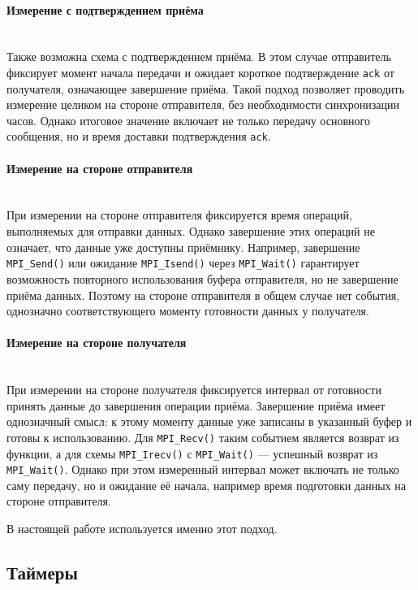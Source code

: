 \documentclass[a4paper,14pt]{extarticle}
\begin{document}
\paragraph{Измерение с подтверждением приёма}\mbox{}\\
\indent Также возможна схема с подтверждением приёма. В этом случае отправитель фиксирует момент начала передачи и ожидает короткое подтверждение \texttt{ack} от получателя, означающее завершение приёма. Такой подход позволяет проводить измерение целиком на стороне отправителя, без необходимости синхронизации часов. Однако итоговое значение включает не только передачу основного сообщения, но и время доставки подтверждения \texttt{ack}.

\paragraph{Измерение на стороне отправителя}\mbox{}\\
\indent При измерении на стороне отправителя фиксируется время операций, выполняемых для отправки данных. Однако завершение этих операций не означает, что данные уже доступны приёмнику. Например, завершение \texttt{MPI\_Send()} или ожидание \texttt{MPI\_Isend()} через \texttt{MPI\_Wait()} гарантирует возможность повторного использования буфера отправителя, но не завершение приёма данных. Поэтому на стороне отправителя в общем случае нет события, однозначно соответствующего моменту готовности данных у получателя.

\paragraph{Измерение на стороне получателя}\mbox{}\\
\indent При измерении на стороне получателя фиксируется интервал от готовности принять данные до завершения операции приёма. Завершение приёма имеет однозначный смысл: к этому моменту данные уже записаны в указанный буфер и готовы к использованию. Для \texttt{MPI\_Recv()} таким событием является возврат из функции, а для схемы \texttt{MPI\_Irecv()} с \texttt{MPI\_Wait()} --- успешный возврат из \texttt{MPI\_Wait()}. Однако при этом измеренный интервал может включать не только саму передачу, но и ожидание её начала, например время подготовки данных на стороне отправителя.

В настоящей работе используется именно этот подход.

\subsection{Таймеры}
\end{document}
